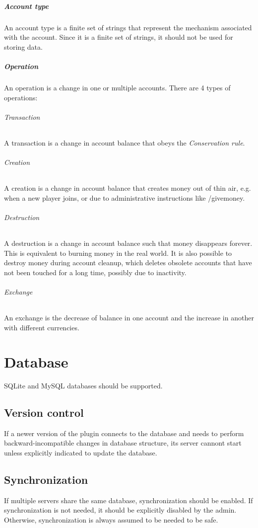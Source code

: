 \documentclass{report}
\begin{document}
			\paragraph{Account type}
				An account type is a finite set of strings that represent the mechanism associated with the account.
				Since it is a finite set of strings, it should not be used for storing data.

			\paragraph{Operation}
				An operation is a change in one or multiple accounts.
				There are 4 types of operations:
				\subparagraph{Transaction} A transaction is a change in account balance that obeys the \textit{Conservation rule}.
				\subparagraph{Creation} A creation is a change in account balance that creates money out of thin air,
					e.g. when a new player joins, or due to administrative instructions like /givemoney.
				\subparagraph{Destruction} A destruction is a change in account balance such that money disappears forever.
					This is equivalent to burning money in the real world.
					It is also possible to destroy money during account cleanup, which
					deletes obsolete accounts that have not been touched for a long time, possibly due to inactivity.
				\subparagraph{Exchange} An exchange is the decrease of balance in one account and the increase in another with different currencies.

		\chapter{Database}

			SQLite and MySQL databases should be supported.

			\section{Version control}

				If a newer version of the plugin connects to the database and needs to perform backward-incompatible changes in database structure,
				its server cannont start unless explicitly indicated to update the database.

			\section{Synchronization}

				If multiple servers share the same database, synchronization should be enabled.
				If synchronization is not needed, it should be explicitly disabled by the admin.
				Otherwise, synchronization is always assumed to be needed to be safe.
\end{document}
